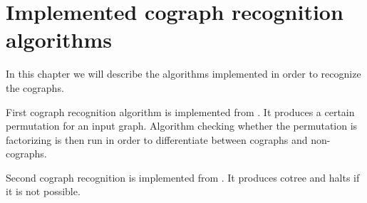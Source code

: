 
\chapter{Implemented cograph recognition algorithms}\label{r:coid}

In this chapter we will describe the algorithms implemented in order to recognize the cographs.

First cograph recognition algorithm is implemented from \cite{habib}. It produces a certain permutation for an input graph. Algorithm checking whether the permutation is factorizing is then run in order to differentiate between cographs and non-cographs.

Second cograph recognition is implemented from \cite{corneil}. It produces cotree and halts if it is not possible.



